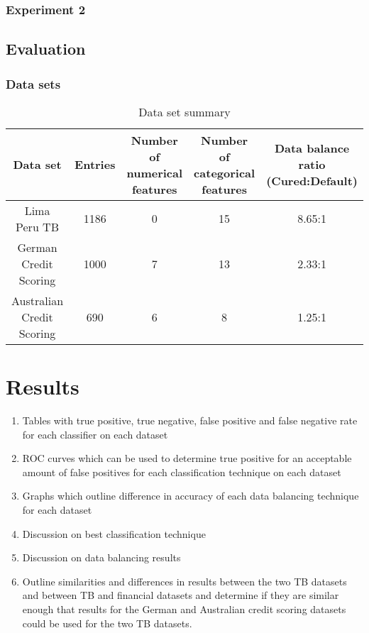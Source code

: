 \documentclass{sig-alternate-05-2015}
\begin{document}
	\subsubsection{Experiment 2}
	
	
	\subsection{Evaluation}
	
	\subsubsection{Data sets}
	\begin{table*}
		\centering
		\caption{Data set summary}
		\label{table:australian_dataset}
		\begin{tabular}{c|c|c|c|c} \hline	
			Data set&Entries&Number of numerical features&Number of categorical features&Data balance ratio (Cured:Default)\\ \hline
			Lima Peru TB \cite{Lackey:10356751520150601}&1186&0&15&8.65:1 \\
			German Credit Scoring&1000&7&13&2.33:1 \\
			Australian Credit Scoring&690&6&8&1.25:1
		\end{tabular}
	\end{table*}
	
	
	\section{Results}
	\begin{enumerate}
		\item Tables with true positive, true negative, false positive and false negative rate for each classifier on each dataset
		\item ROC curves which can be used to determine true positive for an acceptable amount of false positives for each classification technique on each dataset
		\item Graphs which outline difference in accuracy of each data balancing technique for each dataset
		\item Discussion on best classification technique
		\item Discussion on data balancing results
		\item Outline similarities and differences in results between the two TB datasets and between TB and financial datasets and determine if they are similar enough that results for the German and Australian credit scoring datasets could be used for the two TB datasets.
	\end{enumerate}
	
\end{document}
